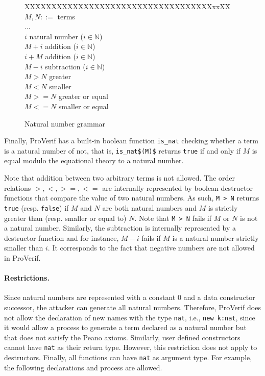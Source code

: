 \documentclass{book}
\begin{document}
\begin{figure}[ht]
\begin{center}
\begin{minipage}{\linewidth}
\begin{tabbing}
   XX\=XXXXXXXXXXXXXXXXXXXXXXXXXXXXXXXXXxx\=XX\=\kill     %
$M,N ::=$ \>    				\> terms 		\\
\> ...\>\\
\> $i$					\>\> natural number ($i \in \mathbb{N}$)\\
\> $M + i$							\>\> addition ($i \in \mathbb{N}$)\\
\> $i + M$							\>\> addition ($i \in \mathbb{N}$)\\
\> $M - i$							\>\> subtraction ($i \in \mathbb{N}$)\\
\> $M > N$							\>\> greater \\
\> $M < N$ 							\>\> smaller\\
\> $M >= N$ 							\>\> greater or equal\\
\> $M <= N$ 							\>\> smaller or equal
\end{tabbing}
\end{minipage}
\end{center}
\caption{Natural number grammar}
\label{fig:natural number}
\end{figure}
Finally, ProVerif  has a built-in boolean function \lstinline!is_nat! checking whether a term is a natural number of not, that is, \lstinline!is_nat$(M)$! returns \lstinline!true! if and only if $M$ is equal modulo the equational theory to a natural number.

Note that addition between two arbitrary terms is not allowed. The order relations $>, <, >=, <=$ are internally represented by boolean destructor functions that compare the value of two natural numbers. As such, \lstinline!M > N! returns \lstinline!true! (resp. \lstinline!false!) if $M$ and $N$ are both natural numbers and $M$ is strictly greater than (resp. smaller or equal to) $N$. Note that \lstinline!M > N! fails if $M$ or $N$ is not a natural number.
Similarly, the subtraction is internally represented by a destructor function and for instance, $M - i$ fails if $M$ is a natural number strictly smaller than $i$. It corresponds to the fact that negative numbers are not allowed in ProVerif.

\paragraph{Restrictions.} Since natural numbers are represented with a constant $0$ and a data constructor successor, the attacker can generate all natural numbers. Therefore, ProVerif does not allow the declaration of new names with the type \lstinline!nat!, i.e., \lstinline!new k:nat!, since it would allow a process to generate a term declared as a natural number but that does not satisfy the Peano axioms. Similarly, user defined constructors cannot have \lstinline!nat! as their return type. However, this restriction does not apply to destructors. Finally, all functions can have \lstinline!nat! as argument type. For example, the following declarations and process are allowed.
\end{document}

